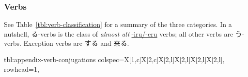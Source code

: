 \documentclass[../nihongo-gakushuu-kyouzai.tex]{subfiles}
\begin{document}
\subsubsection{Verbs}
See Table~\ref{tbl:verb-classification} for a summary of the three categories. In a nutshell, る-verbs is the class of \emph{almost all} \ul{-iru/-eru} verbs; all other verbs are う-verbs. Exception verbs are する and 来る. 

{tbl:appendix-verb-conjugations}  %
{}  %
{
    colspec={X[1,c]X[2,c]X[2,l]X[2,l]X[2,l]X[2,l]},
    rowhead=1,
}  %
\end{document}

